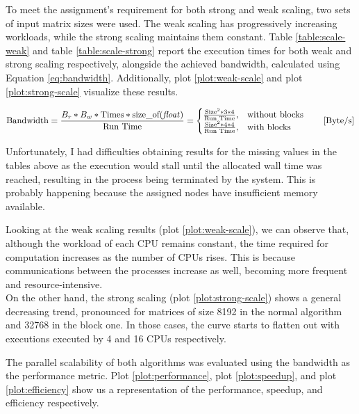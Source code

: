 To meet the assignment's requirement for both strong and weak scaling, two sets of %
input matrix sizes were used. The weak scaling has progressively increasing %
workloads, while the strong scaling maintains them constant. Table \ref{table:scale-weak} %
and table \ref{table:scale-strong} report the execution times for both weak %
and strong scaling respectively, alongside the achieved bandwidth, %
calculated using Equation \ref{eq:bandwidth}. Additionally, plot \ref{plot:weak-scale} %
and plot \ref{plot:strong-scale} visualize these results.

\begin{equation}
    \label{eq:bandwidth}
    \text{Bandwidth} = \frac{B_r * B_w * \text{Times} * \text{size\_of(\textit{float})}}{\text{Run Time}} = 
    \begin{cases}
        \frac{\text{Size}^2 * 3 * 4}{\text{Run Time}}, & \text{without blocks}\\
        \frac{\text{Size}^2 * 4 * 4}{\text{Run Time}}, & \text{with blocks}
    \end{cases}\qquad\text{[Byte/s]}
\end{equation}

Unfortunately, I had difficulties obtaining results for the missing values in the %
tables above as the execution would stall until the allocated wall time was reached, %
resulting in the process being terminated by the system. This is probably happening %
because the assigned nodes have insufficient memory available.







Looking at the weak scaling results (plot \ref{plot:weak-scale}), we can observe %
that, although the workload of each CPU remains constant, the time required for %
computation increases as the number of CPUs rises. %
This is because communications between the processes increase as well, %
becoming more frequent and resource-intensive. \\%
On the other hand, the strong scaling (plot \ref{plot:strong-scale}) shows a general decreasing %
trend, pronounced for matrices of size 8192 in the %
normal algorithm and 32768 in the block one. In those cases, the curve starts to %
flatten out with executions executed by 4 and 16 CPUs respectively.

The parallel scalability of both algorithms was evaluated using the bandwidth %
as the performance metric. Plot \ref{plot:performance}, plot \ref{plot:speedup}, and %
plot \ref{plot:efficiency} show us a representation of the performance, speedup, and %
efficiency respectively.

